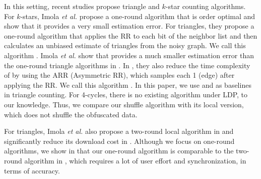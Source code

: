 
In this setting, recent studies propose triangle \cite{Imola_USENIX21,Imola_USENIX22,Ye_ICDE20,Ye_TKDE21} and $k$-star \cite{Imola_USENIX21} counting algorithms. 
For $k$-stars, Imola \textit{et al.} \cite{Imola_USENIX21} propose a one-round algorithm that is order optimal and show that it provides a very small estimation error. 
For triangles, they
propose a one-round algorithm that applies the RR to 
each bit of the neighbor list 
and then calculates an unbiased estimate of triangles from the noisy graph. 
We call this algorithm \AlgRRTri{}. 
Imola \textit{et al.} \cite{Imola_USENIX22} show that \AlgRRTri{} provides a much smaller estimation error than the one-round triangle algorithms in \cite{Ye_ICDE20,Ye_TKDE21}. 
In \cite{Imola_USENIX22}, they also reduce the time complexity of \AlgRRTri{} 
by using the ARR (Asymmetric RR), which samples each 1 (edge) after applying the RR. 
We call this algorithm \AlgARRTri{}. 
In this paper, we use \AlgRRTri{} and \AlgARRTri{} as baselines in triangle counting. 
For 4-cycles, there is no existing algorithm under LDP, to our knowledge. 
Thus, we compare our shuffle algorithm with its local version, which does not shuffle the obfuscated data. 

For triangles, Imola \textit{et al.} also propose a two-round local algorithm in \cite{Imola_USENIX21} and significantly reduce its download cost in \cite{Imola_USENIX22}. 
Although we focus on one-round algorithms, 
we show in 
that our one-round algorithm is comparable to the two-round algorithm in \cite{Imola_USENIX22}, which requires a lot of user effort and synchronization, in terms of accuracy. 

